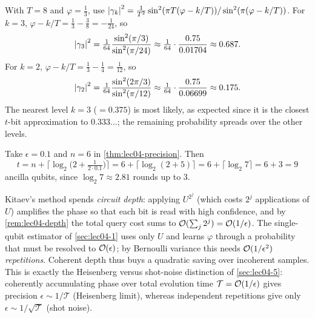 \begin{solution}
With $T=8$ and $\varphi=\tfrac13$, use
$\left\lvert \gamma_k \right\rvert^{2}=\tfrac{1}{T^{2}}\sin^{2}(\pi T(\varphi-k/T))/
\sin^{2}(\pi(\varphi-k/T))$. For $k=3$, $\varphi-k/T=\tfrac13-\tfrac38
=-\tfrac{1}{24}$, so
\[
  \left\lvert \gamma_3 \right\rvert^{2}=\tfrac{1}{64}\frac{\sin^2(\pi/3)}{\sin^2(\pi/24)}
   \approx\tfrac{1}{64}\cdot\frac{0.75}{0.01704}\approx0.687.
\]
For $k=2$, $\varphi-k/T=\tfrac13-\tfrac14=\tfrac{1}{12}$, so
\[
  \left\lvert \gamma_2 \right\rvert^{2}=\tfrac{1}{64}\frac{\sin^2(2\pi/3)}{\sin^2(\pi/12)}
   \approx\tfrac{1}{64}\cdot\frac{0.75}{0.06699}\approx0.175.
\]
The nearest level $k=3$ ($=0.375$) is most likely, as expected since it is the
closest $t$-bit approximation to $0.333\ldots$; the remaining probability spreads
over the other levels.
\end{solution}

\begin{solution}
Take $\epsilon=0.1$ and $n=6$ in \cref{thm:lec04-precision}. Then
\[
  t=n+\bigl\lceil\log_2\bigl(2+\tfrac{1}{2\cdot0.1}\bigr)\bigr\rceil
   =6+\lceil\log_2(2+5)\rceil=6+\lceil\log_2 7\rceil=6+3=9
\]
ancilla qubits, since $\log_2 7\approx2.81$ rounds up to $3$.
\end{solution}

\begin{solution}
Kitaev's method spends \emph{circuit depth}: applying $U^{2^{j}}$ (which costs
$2^{j}$ applications of $U$) amplifies the phase so that each bit is read with
high confidence, and by \cref{rem:lec04-depth} the total query cost sums to
$\mathcal{O}(\sum_j 2^j)=\mathcal{O}(1/\epsilon)$. The single-qubit estimator of
\cref{sec:lec04-1} uses only $U$ and learns $\varphi$ through a probability that
must be resolved to $\mathcal{O}(\epsilon)$; by Bernoulli variance this needs
$\mathcal{O}(1/\epsilon^{2})$ \emph{repetitions}. Coherent depth thus buys a quadratic
saving over incoherent samples. This is exactly the Heisenberg versus shot-noise
distinction of \cref{sec:lec04-5}: coherently accumulating phase over total
evolution time $\mathcal{T}=\mathcal{O}(1/\epsilon)$ gives precision
$\epsilon\sim1/\mathcal{T}$ (Heisenberg limit), whereas independent repetitions
give only $\epsilon\sim1/\sqrt{\mathcal{T}}$ (shot noise).
\end{solution}

